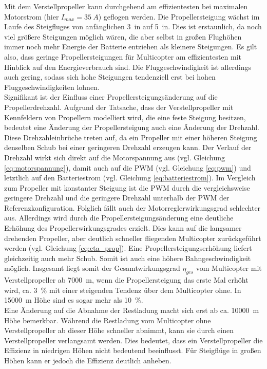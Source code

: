Mit dem Verstellpropeller kann durchgehend am effizientesten bei maximalen Motorstrom (hier \ensuremath{I_{max} = \SI{35}{A}}) geflogen werden. Die Propellersteigung wächst im Laufe des Steigfluges von anfänglichen \SI{3}{in} auf \SI{5}{in}. Dies ist erstaunlich, da noch viel größere Steigungen möglich wären, die aber selbst in großen Flughöhen immer noch mehr Energie der Batterie entziehen als kleinere Steigungen. Es gilt also, dass geringe Propellersteigungen für Multicopter am effizientesten mit Hinblick auf den Energieverbrauch sind. Die Fluggeschwindigkeit ist allerdings auch gering, sodass sich hohe Steigungen tendenziell erst bei hohen Fluggeschwindigkeiten lohnen. \\
Signifikant ist der Einfluss einer Propellersteigungsänderung auf die Propellerdrehzahl. Aufgrund der Tatsache, dass der Verstellpropeller mit Kennfeldern von Propellern modelliert wird, die eine feste Steigung besitzen, bedeutet eine Änderung der Propellersteigung auch eine Änderung der Drehzahl. Diese Drehzahleinbrüche treten auf, da ein Propeller mit einer höheren Steigung denselben Schub bei einer geringeren Drehzahl erzeugen kann. Der Verlauf der Drehzahl wirkt sich direkt auf die Motorspannung aus (vgl. Gleichung \ref{eq:motorspannung}), damit auch auf die PWM (vgl. Gleichung \ref{eq:pwm}) und letztlich auf den Batteriestrom (vgl. Gleichung \ref{eq:batteriestrom}). Im Vergleich zum Propeller mit konstanter Steigung ist die PWM durch die vergleichsweise geringere Drehzahl und die geringere Drehzahl unterhalb der PWM der Referenzkonfiguration. Folglich fällt auch der Motorreglerwirkungsgrad schlechter aus. Allerdings wird durch die Propellersteigungsänderung eine deutliche Erhöhung des Propellerwirkungsgrades erzielt. Dies kann auf die langsamer drehenden Propeller, aber deutlich schneller fliegenden Multicopter zurückgeführt werden (vgl. Gleichung \ref{eq:eta_prop}). Eine Propellersteigungserhöhung liefert gleichzeitig auch mehr Schub. Somit ist auch eine höhere Bahngeschwindigkeit möglich. Insgesamt liegt somit der Gesamtwirkungsgrad \ensuremath{\eta_{ges}} vom Multicopter mit Verstellpropeller ab \SI{7000}{m}, wenn die Propellersteigung das erste Mal erhöht wird, ca. \SI{3}{\%} mit einer steigenden Tendenz über dem Multicopter ohne. In \SI{15000}{m} Höhe sind es sogar mehr als \SI{10}{\%}. \\
Eine Änderung auf die Abnahme der Restladung macht sich erst ab ca. \SI{10000}{m} Höhe bemerkbar. Während die Restladung vom Multicopter ohne Verstellpropeller ab dieser Höhe schneller abnimmt, kann sie durch einen Verstellpropeller verlangsamt werden. Dies bedeutet, dass ein Verstellpropeller die Effizienz in niedrigen Höhen nicht bedeutend beeinflusst. Für Steigflüge in großen Höhen kann er jedoch die Effizienz deutlich anheben.
